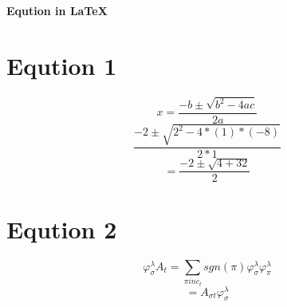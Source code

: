 \documentclass[10pt,a4paper]{article}
\begin{document}
\begin{center}
    \large{\textbf{Eqution in \LaTeX}}
\end{center}
\section*{Eqution 1}
\begin{fleqn}
\[
x=\frac{-b \pm \sqrt{b^2-4ac}}{2a}
\]
\[
\frac{-2 \pm \sqrt{2^2-4*(1)*(-8)}}{2*1}
\]
\[
=\frac{-2 \pm \sqrt{4+32}}{2}
\]
\end{fleqn}
\section{Eqution 2}
\begin{fleqn}
\[
\varphi^{\lambda}_{\sigma}A_{t}=\sum_{\pi in c_{t}}
sgn(\pi)\varphi^{\lambda}_{\sigma}\varphi^{\lambda}_{\pi}
\]
\[
=A_{\sigma t}\varphi^{\lambda}_{\sigma}
\]
\end{fleqn}
\end{document}
